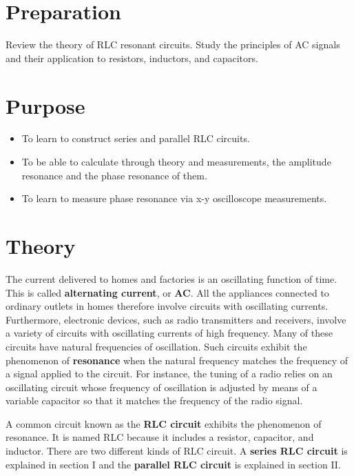 \section{Preparation}
Review the theory of RLC resonant circuits. Study the principles of AC signals and their application to resistors, inductors, and capacitors. 

\section{Purpose}
\begin{itemize}
    \item To learn to construct series and parallel RLC circuits.
    \item To be able to calculate through theory and measurements, the amplitude resonance and the phase resonance of them.
    \item To learn to measure phase resonance via x-y oscilloscope measurements.
\end{itemize}

\section{Theory}
The current delivered to homes and factories is an oscillating function of time. This is called {\bf alternating current}, or {\bf AC}. All the appliances connected to ordinary outlets in homes therefore involve circuits with oscillating currents. Furthermore, electronic devices, such as radio transmitters and receivers, involve a variety of circuits with oscillating currents of high frequency. Many of these circuits have natural frequencies of oscillation. Such circuits exhibit the phenomenon of {\bf resonance} when the natural frequency matches the frequency of a signal applied to the circuit. For instance, the tuning of a radio relies on an oscillating circuit whose frequency of oscillation is adjusted by means of a variable capacitor so that it matches the frequency of the radio signal.

A common circuit known as the {\bf RLC circuit} exhibits the phenomenon of resonance. It is named RLC because it includes a resistor, capacitor, and inductor. There are two different kinds of RLC circuit. A {\bf series RLC circuit} is explained in section I and the {\bf parallel RLC circuit} is explained in section II.

